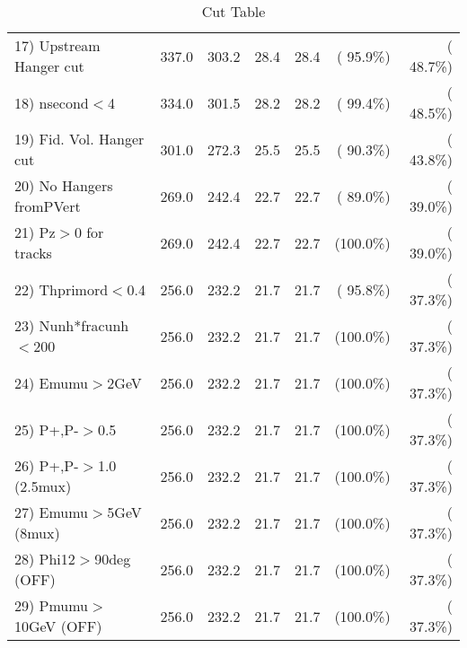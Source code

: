 \begin{table}[h!]
\begin{tabular}{||l||r|r|r|r|r|r||}
 17) Upstream Hanger cut  &        337.0 &        303.2 &         28.4 &         28.4 & ( 95.9\%) & ( 48.7\%) \\
 18) nsecond$<$4          &        334.0 &        301.5 &         28.2 &         28.2 & ( 99.4\%) & ( 48.5\%) \\
 19) Fid. Vol. Hanger cut &        301.0 &        272.3 &         25.5 &         25.5 & ( 90.3\%) & ( 43.8\%) \\
 20) No Hangers fromPVert &        269.0 &        242.4 &         22.7 &         22.7 & ( 89.0\%) & ( 39.0\%) \\
 21) Pz$>$0 for tracks    &        269.0 &        242.4 &         22.7 &         22.7 & (100.0\%) & ( 39.0\%) \\
 22) Thprimord$<$0.4      &        256.0 &        232.2 &         21.7 &         21.7 & ( 95.8\%) & ( 37.3\%) \\
 23) Nunh*fracunh$<$200   &        256.0 &        232.2 &         21.7 &         21.7 & (100.0\%) & ( 37.3\%) \\
 24) Emumu$>$2GeV         &        256.0 &        232.2 &         21.7 &         21.7 & (100.0\%) & ( 37.3\%) \\
 25) P+,P-$>$0.5          &        256.0 &        232.2 &         21.7 &         21.7 & (100.0\%) & ( 37.3\%) \\
 26) P+,P-$>$1.0 (2.5mux) &        256.0 &        232.2 &         21.7 &         21.7 & (100.0\%) & ( 37.3\%) \\
 27) Emumu$>$5GeV  (8mux) &        256.0 &        232.2 &         21.7 &         21.7 & (100.0\%) & ( 37.3\%) \\
 28) Phi12$>$90deg  (OFF) &        256.0 &        232.2 &         21.7 &         21.7 & (100.0\%) & ( 37.3\%) \\
 29) Pmumu$>$10GeV  (OFF) &        256.0 &        232.2 &         21.7 &         21.7 & (100.0\%) & ( 37.3\%) \\
 \hline
 \hline
 \end{tabular}
 \caption{Cut Table           }
 \label{tab-cutcohjpsi-mumu_anumucc}
 \end{table}
